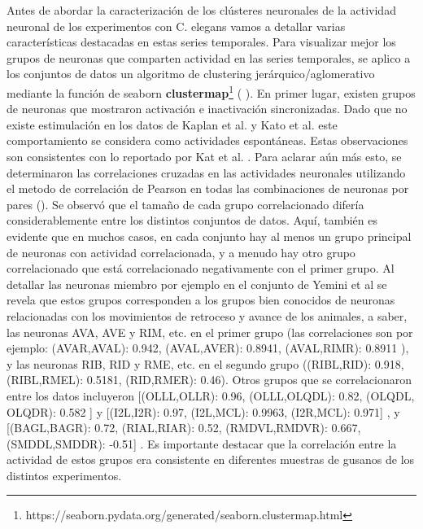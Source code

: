  Antes de abordar la caracterización de los clústeres neuronales de la actividad neuronal de los experimentos con C. elegans vamos a detallar varias características destacadas en estas series temporales. Para visualizar mejor los grupos de neuronas que comparten actividad en  las series temporales, se aplico a los conjuntos de datos un algoritmo de clustering jerárquico/aglomerativo mediante la función de seaborn  \textbf{clustermap}\footnote{https://seaborn.pydata.org/generated/seaborn.clustermap.html} (  ).  En primer lugar, existen grupos de neuronas  que mostraron activación e inactivación sincronizadas. Dado que no existe estimulación en los datos de Kaplan et al. y Kato et al. este comportamiento se considera como  actividades espontáneas. Estas observaciones son consistentes con lo reportado por Kat et al. \cite{kato_global_2015}. Para aclarar aún más esto, se determinaron las correlaciones cruzadas en las actividades neuronales utilizando el metodo de correlación de Pearson 
 en todas las combinaciones de neuronas por pares (). Se observó que el tamaño de cada grupo correlacionado difería considerablemente entre los distintos conjuntos de datos. Aquí, también es evidente que en muchos casos, en cada conjunto  hay al menos un grupo principal de neuronas con actividad correlacionada, y a menudo hay otro grupo correlacionado que está correlacionado negativamente con el primer grupo. Al detallar las  neuronas miembro por ejemplo en el conjunto de Yemini et al se revela que estos grupos corresponden a los grupos bien conocidos de neuronas relacionadas con los movimientos de retroceso y avance de los animales, a saber, las neuronas AVA, AVE y RIM, etc. en el primer grupo (las correlaciones son por ejemplo: (AVAR,AVAL): 0.942, (AVAL,AVER): 0.8941, (AVAL,RIMR): 0.8911 ), y las neuronas RIB, RID y RME, etc. en el segundo grupo ((RIBL,RID): 0.918, (RIBL,RMEL): 0.5181, (RID,RMER): 0.46). Otros grupos que se correlacionaron entre los datos incluyeron  [(OLLL,OLLR): 0.96, (OLLL,OLQDL): 0.82, (OLQDL, OLQDR): 0.582 ]  y [(I2L,I2R): 0.97, (I2L,MCL): 0.9963, (I2R,MCL): 0.971]     , y  [(BAGL,BAGR): 0.72, (RIAL,RIAR): 0.52, (RMDVL,RMDVR): 0.667, (SMDDL,SMDDR): -0.51] \cite{toyoshima_deducing_2022}. Es importante destacar  que la correlación entre la actividad de estos grupos era consistente en diferentes muestras de gusanos de los distintos experimentos.
 

